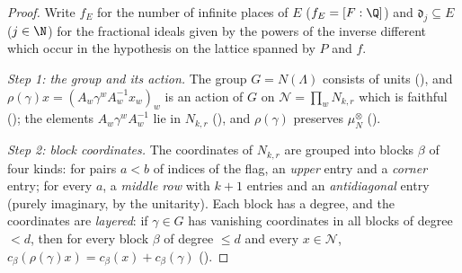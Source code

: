 \begin{proof}
Write $f_E$ for the number of infinite places of $E$ ($f_E=[F:\Q]$) and $\mathfrak d_j\subseteq E$ ($j\in\N$) for the fractional ideals
given by the powers of the inverse different which occur in the hypothesis on the lattice spanned by $P$ and $f$.

\emph{Step 1: the group and its action.} The group $G=N(\Lambda)$ consists of units
(), and $\rho(\gamma)x=(A_w\gamma^wA_w^{-1}x_w)_w$ is an action of
$G$ on $\mathcal N=\prod_wN_{k,r}$ which is faithful (); the elements
$A_w\gamma^wA_w^{-1}$ lie in $N_{k,r}$ (), and $\rho(\gamma)$
preserves $\mu_N^{\otimes}$ ().

\emph{Step 2: block coordinates.} The coordinates of $N_{k,r}$ are grouped into blocks $\beta$ of four kinds: for pairs $a<b$ of
indices of the flag, an \emph{upper} entry and a \emph{corner} entry; for every $a$, a \emph{middle row} with $k+1$ entries and an
\emph{antidiagonal} entry (purely imaginary, by the unitarity). Each block has a degree, and the coordinates are \emph{layered}: if
$\gamma\in G$ has vanishing coordinates in all blocks of degree $<d$, then for every block $\beta$ of degree $\le d$ and every
$x\in\mathcal N$, $c_\beta(\rho(\gamma)x)=c_\beta(x)+c_\beta(\gamma)$
().


\end{proof}
